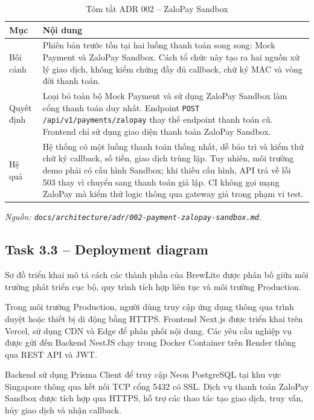 \begin{table}[H]
\centering
\small
\caption{Tóm tắt ADR 002 -- ZaloPay Sandbox}
\label{tabB:adr2}
\begin{tabularx}{\textwidth}{@{}p{2.3cm} X@{}}
\toprule
\textbf{Mục} & \textbf{Nội dung} \\
\midrule

Bối cảnh &
Phiên bản trước tồn tại hai luồng thanh toán song song: Mock Payment và ZaloPay Sandbox. Cách tổ chức này tạo ra hai nguồn xử lý giao dịch, không kiểm chứng đầy đủ callback, chữ ký MAC và vòng đời thanh toán. \\

Quyết định &
Loại bỏ toàn bộ Mock Payment và sử dụng ZaloPay Sandbox làm cổng thanh toán duy nhất. Endpoint \texttt{POST /api/v1/payments/zalopay} thay thế endpoint thanh toán cũ. Frontend chỉ sử dụng giao diện thanh toán ZaloPay Sandbox. \\

Hệ quả &
Hệ thống có một luồng thanh toán thống nhất, dễ bảo trì và kiểm thử chữ ký callback, số tiền, giao dịch trùng lặp. Tuy nhiên, môi trường demo phải có cấu hình Sandbox; khi thiếu cấu hình, API trả về lỗi 503 thay vì chuyển sang thanh toán giả lập. CI không gọi mạng ZaloPay mà kiểm thử logic thông qua gateway giả trong phạm vi test. \\

\bottomrule
\end{tabularx}
\end{table}

\textit{Nguồn: \texttt{docs/architecture/adr/002-payment-zalopay-sandbox.md}.}

\subsection{Task 3.3 -- Deployment diagram}

Sơ đồ triển khai mô tả cách các thành phần của BrewLite được phân bố giữa môi trường phát triển cục bộ, quy trình tích hợp liên tục và môi trường Production.

Trong môi trường Production, người dùng truy cập ứng dụng thông qua trình duyệt hoặc thiết bị di động bằng HTTPS. Frontend Next.js được triển khai trên Vercel, sử dụng CDN và Edge để phân phối nội dung. Các yêu cầu nghiệp vụ được gửi đến Backend NestJS chạy trong Docker Container trên Render thông qua REST API và JWT.

Backend sử dụng Prisma Client để truy cập Neon PostgreSQL tại khu vực Singapore thông qua kết nối TCP cổng 5432 có SSL. Dịch vụ thanh toán ZaloPay Sandbox được tích hợp qua HTTPS, hỗ trợ các thao tác tạo giao dịch, truy vấn, hủy giao dịch và nhận callback.

